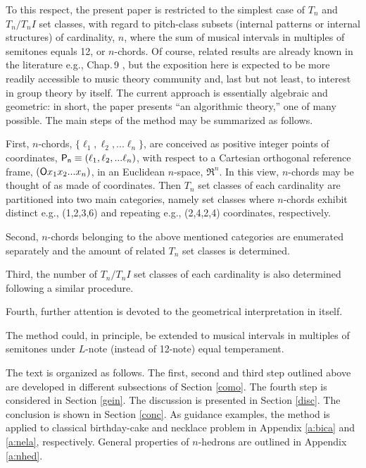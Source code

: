 \documentclass[12pt,a4paper]{article}
\begin{document}
To this respect, the present paper is restricted to the simplest case of $T_n$
and $T_n/T_nI$ set classes, with regard to pitch-class subsets (internal
patterns or internal structures) of cardinality, $n$, where the sum of musical
intervals in multiples of semitones equals 12, or $n$-chords.  Of course,
related results are already known in
the literature e.g., \cite{Rei85}\cite{Ben06} Chap.\,9
\cite{Hoo07}\cite{Fri93}\cite{Fri99}\cite{Rea97}\cite{Jed06}, but the
exposition here is expected
to be more readily accessible to music theory community and, last but not 
least, to interest in group theory by itself.   The current approach is
essentially algebraic and geometric: in short, the paper presents ``an
algorithmic theory,'' one of many possible.   The main steps of the method
may be summarized as follows.

First, $n$-chords, $\{\ell_1,\ell_2,...\ell_n\}$, are
conceived as positive integer points of coordinates,
${\sf P_n}\equiv(\ell_1,\ell_2,...\ell_n)$, with respect to a Cartesian
orthogonal reference frame, $({\sf O}x_1x_2...x_n)$, in an Euclidean
$n$-space, $\Re^n$.   In this view, $n$-chords may be
thought of as made of coordinates.   Then $T_n$ set classes of each
cardinality are partitioned into two main categories, namely set classes where
$n$-chords exhibit distinct e.g., (1,2,3,6) and repeating e.g., (2,4,2,4)
coordinates, respectively.

Second, $n$-chords belonging to the above mentioned categories are
enumerated separately and the amount of related $T_n$ set classes is
determined.

Third, the number of $T_n/T_nI$ set classes of each cardinality is also
determined following a similar procedure.

Fourth, further attention is
devoted to the geometrical interpretation in itself.

The method could, in
principle, be extended to musical intervals in multiples of semitones
under $L$-note (instead of 12-note) equal temperament.

The text is organized as follows.   The first, second and third step outlined
above are developed in different subsections of Section \ref{como}.  The
fourth step is considered in Section \ref{gein}.   The discussion is presented
in Section \ref{disc}.      The conclusion is shown in Section \ref{conc}.
As guidance examples, the method is applied to classical birthday-cake and
necklace problem in Appendix \ref{a:bica} and \ref{a:nela}, respectively.
General properties of $n$-hedrons are outlined in Appendix \ref{a:nhed}.
\end{document}
